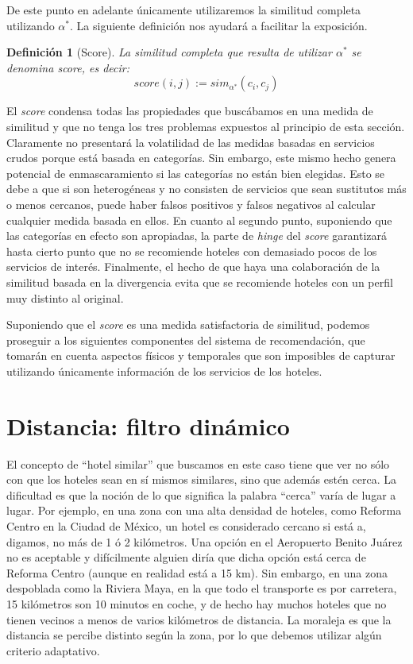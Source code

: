 \documentclass[12pt]{report}
\newtheorem{defn}{Definici\'on}[chapter]
\begin{document}
De este punto en adelante únicamente utilizaremos la similitud completa utilizando $\alpha^*$. La siguiente definición nos ayudará a facilitar la exposición.
\begin{defn}[Score]
La similitud completa que resulta de utilizar $\alpha^*$ se denomina \emph{score}, es decir:
\[
score(i,j) := sim_{\alpha^*}(c_i, c_j)
\]
\end{defn}
El \emph{score} condensa todas las propiedades que buscábamos en una medida de similitud y que no tenga los tres problemas expuestos al principio de esta sección. Claramente no presentará la volatilidad de las medidas basadas en servicios crudos porque está basada en categorías. Sin embargo, este mismo hecho genera potencial de enmascaramiento si las categorías no están bien elegidas. Esto se debe a que si son heterogéneas y no consisten de servicios que sean sustitutos más o menos cercanos, puede haber falsos positivos y falsos negativos al calcular cualquier medida basada en ellos. En cuanto al segundo punto, suponiendo que las categorías en efecto son apropiadas, la parte de \emph{hinge} del \emph{score} garantizará hasta cierto punto que no se recomiende hoteles con demasiado pocos de los servicios de interés. Finalmente, el hecho de que haya una colaboración de la similitud basada en la divergencia evita que se recomiende hoteles con un perfil muy distinto al original.

Suponiendo que el \emph{score} es una medida satisfactoria de similitud, podemos proseguir a los siguientes componentes del sistema de recomendación, que tomarán en cuenta aspectos físicos y temporales que son imposibles de capturar utilizando únicamente información de los servicios de los hoteles.

\section{Distancia: filtro dinámico}

El concepto de ``hotel similar'' que buscamos en este caso tiene que ver no sólo con que los hoteles sean en sí mismos similares, sino que además estén cerca. La dificultad es que la noción de lo que significa la palabra ``cerca'' varía de lugar a lugar. Por ejemplo, en una zona con una alta densidad de hoteles, como Reforma Centro en la Ciudad de México, un hotel es considerado cercano si está a, digamos, no más de 1 ó 2 kilómetros. Una opción en el Aeropuerto Benito Juárez no es aceptable y difícilmente alguien diría que dicha opción está cerca de Reforma Centro (aunque en realidad está a 15 km). Sin embargo, en una zona despoblada como la Riviera Maya, en la que todo el transporte es por carretera, 15 kilómetros son 10 minutos en coche, y de hecho hay muchos hoteles que no tienen vecinos a menos de varios kilómetros de distancia. La moraleja es que la distancia se percibe distinto según la zona, por lo que debemos utilizar algún criterio adaptativo.
\end{document}
